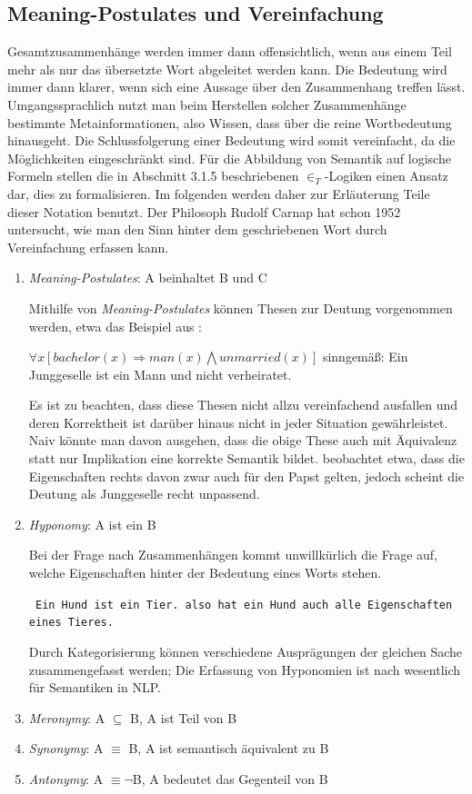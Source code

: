 \documentclass[12pt]{report}
\begin{document}
\subsection{Meaning-Postulates und Vereinfachung}
Gesamtzusammenhänge werden immer dann offensichtlich, wenn aus einem Teil mehr als nur das übersetzte Wort abgeleitet werden kann. Die Bedeutung wird immer dann klarer, wenn sich eine Aussage über den Zusammenhang treffen lässt. Umgangssprachlich nutzt man beim Herstellen solcher Zusammenhänge bestimmte Metainformationen, also Wissen, dass über die reine Wortbedeutung hinausgeht. Die Schlussfolgerung einer Bedeutung wird somit vereinfacht, da die Möglichkeiten eingeschränkt sind. Für die Abbildung von Semantik auf logische Formeln stellen die in Abschnitt 3.1.5 beschriebenen $\in_T$-Logiken einen Ansatz dar, dies zu formalisieren. Im folgenden werden daher zur Erläuterung Teile dieser Notation benutzt. Der Philosoph Rudolf Carnap hat schon 1952  untersucht, wie man den Sinn hinter dem geschriebenen Wort durch Vereinfachung erfassen kann. 
\begin{enumerate}
\item \textit{Meaning-Postulates}: A beinhaltet B und C

Mithilfe von \textit{Meaning-Postulates} können Thesen zur Deutung vorgenommen werden, etwa das Beispiel aus \cite{car52}:

$\forall x[bachelor(x)\Rightarrow man(x)\bigwedge unmarried(x)]$
sinngemäß: Ein Junggeselle ist ein Mann und nicht verheiratet.

Es ist zu beachten, dass diese Thesen nicht allzu vereinfachend ausfallen und deren Korrektheit ist darüber hinaus nicht in jeder Situation gewährleistet. Naiv könnte man davon ausgehen, dass die obige These auch mit Äquivalenz statt nur Implikation eine korrekte Semantik bildet. \cite{car52} beobachtet etwa, dass die Eigenschaften rechts davon zwar auch für den Papst gelten, jedoch scheint die Deutung als Junggeselle recht unpassend.

\item \textit{Hyponomy}: A ist ein B

Bei der Frage nach Zusammenhängen kommt unwillkürlich die Frage auf, welche Eigenschaften hinter der Bedeutung eines Worts stehen. 

\tt
Ein Hund ist ein Tier. 
\rm
also hat ein Hund auch alle Eigenschaften eines Tieres.

Durch Kategorisierung können verschiedene Ausprägungen  der gleichen Sache zusammengefasst werden; Die Erfassung von Hyponomien ist nach \cite{cop04} wesentlich für Semantiken in NLP.

\item \textit{Meronymy}: A $\subseteq$ B, A ist Teil von B

\item \textit{Synonymy}: A $\equiv$ B, A ist semantisch äquivalent zu B

\item \textit{Antonymy}: A $\equiv \neg$B, A bedeutet das Gegenteil von B

\end{enumerate}
\end{document}
